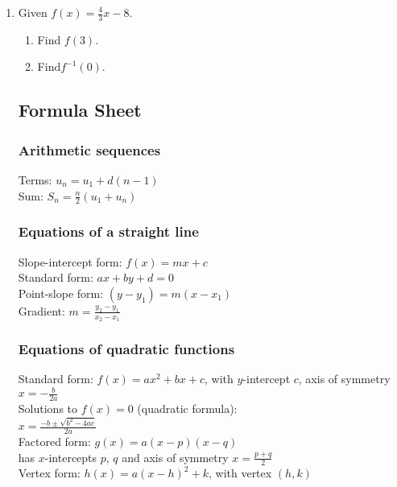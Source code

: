 \documentclass[12pt, twoside]{article}
\begin{document}
\begin{enumerate}
\item Given $\displaystyle f(x)=\frac{4}{3}x-8$.
\begin{multicols*}{2}
    \begin{enumerate}
        \item Find $f(3)$. \vspace{2cm}
        \item Find$f^{-1}(0)$.
    \end{enumerate}
\end{multicols*}


\newpage
\subsection*{Formula Sheet}
\subsubsection*{Arithmetic sequences}
Terms: $u_n=u_1 + d(n-1)$\\[0.25cm]
Sum: $\displaystyle S_n= \frac{n}{2}(u_1 + u_n)$

\subsubsection*{Equations of a straight line} 
Slope-intercept form: $f(x)=mx+c$\\[0.25cm]
Standard form: $ax+by+d=0$\\[0.25cm]
Point-slope form: $(y-y_1)=m(x-x_1)$\\[0.25cm]
Gradient: $\displaystyle m=\frac{y_2-y_1}{x_2-x_1}$

\subsubsection*{Equations of quadratic functions}
Standard form: $f(x)=ax^2 + bx+c$, with $y$-intercept $c$, axis of symmetry $\displaystyle x=-\frac{b}{2a}$\\[0.25cm]
Solutions to $f(x)=0$ (quadratic formula): \\[0.25cm]
$\displaystyle x=\frac{-b \pm \sqrt{b^2-4ac}}{2a}$\\[0.25cm]
Factored form: $g(x)=a(x-p)(x-q)$ \\[0.25cm]
has $x$-intercepts $p$, $q$ and axis of symmetry $\displaystyle x=\frac{p+q}{2}$\\[0.25cm] 
Vertex form: $h(x)=a(x-h)^2+k$, with vertex $(h,k)$


\end{enumerate}
\end{document}
